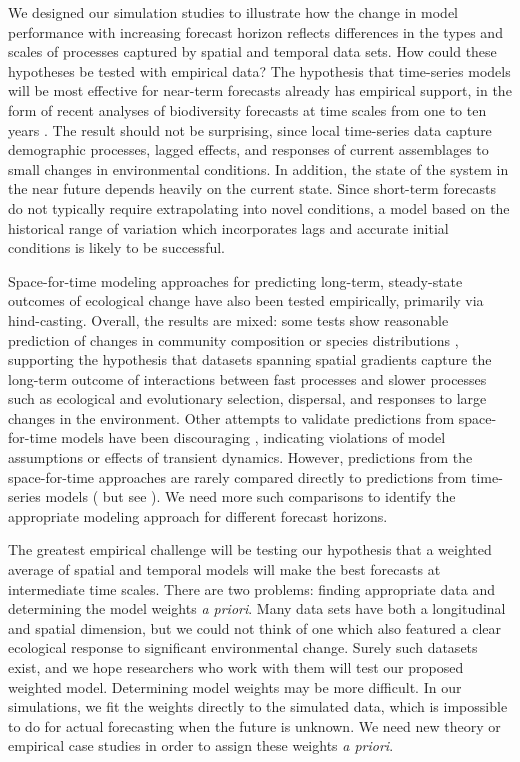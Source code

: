 \documentclass[11pt]{article}
\begin{document}
We designed our simulation studies to illustrate how the change in model performance with increasing forecast horizon reflects differences in the types and scales of processes captured by spatial and temporal data sets. How could these hypotheses be tested with empirical data? The hypothesis that time-series models will be most effective for near-term forecasts already has empirical support, in the form of recent analyses of biodiversity forecasts at time scales from one to ten years \citep{harris_forecasting_2018}. The result should not be surprising, since local time-series data capture demographic processes, lagged effects, and responses of current assemblages to small changes in environmental conditions. In addition, the state of the system in the near future depends heavily on the current state. Since short-term forecasts do not typically require extrapolating into novel conditions, a model based on the historical range of variation which incorporates lags and accurate initial conditions is likely to be successful.

Space-for-time modeling approaches for predicting long-term, steady-state outcomes of ecological change have also been tested empirically, primarily via hind-casting. Overall, the results are mixed: some tests show reasonable prediction of changes in community composition \citep{Blois2013,Illan2014} or species distributions \citep{Norberg2019}, supporting the hypothesis that datasets spanning spatial gradients capture the long-term outcome of interactions between fast processes and slower processes such as ecological and evolutionary selection, dispersal, and responses to large changes in the environment. Other attempts to validate predictions from space-for-time models have been discouraging \citep{Worth2014,Illan2014,Davis2014,Brun2016,Veloz2012}, indicating violations of model assumptions or effects of transient dynamics. However, predictions from the space-for-time approaches are rarely compared directly to predictions from time-series models (\citealt{harris_forecasting_2018} but see \citealt{Renwick2018}). We need more such comparisons to identify the appropriate modeling approach for different forecast horizons. 

The greatest empirical challenge will be testing our hypothesis that a weighted average of spatial and temporal models will make the best forecasts at intermediate time scales. There are two problems: finding appropriate data and determining the model weights \emph{a priori}. Many data sets have both a longitudinal and spatial dimension, but we could not think of one which also featured a clear ecological response to significant environmental change. Surely such datasets exist, and we hope researchers who work with them will test our proposed weighted model. Determining model weights may be more difficult. In our simulations, we fit the weights directly to the simulated data, which is impossible to do for actual forecasting when the future is unknown. We need new theory or empirical case studies in order to assign these weights \emph{a priori}. 
\end{document}
